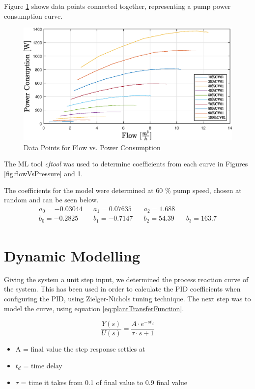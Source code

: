 \newpage
Figure \ref{fig:flowVsPowerConsumption} shows data points connected together, representing a pump
power consumption curve.

\begin{figure}[ht]
	\centering
	\includegraphics[width=1\textwidth]{figures/05mathematicalModelling/flowVsPowerRun34.eps}
	\caption{Data Points for Flow vs. Power Consumption}
	\label{fig:flowVsPowerConsumption}
\end{figure}

The ML tool \textit{cftool} \cite{cftool} was used to determine coefficients from each curve in  Figures 
\ref{fig:flowVsPressure} and \ref{fig:flowVsPowerConsumption}.

The coefficients for the model were determined at 60 \% pump speed, chosen at random and can be seen below.
\begin{align*}
	a_0 = -0.03044 && a_1 = 0.07635  && a_2 = 1.688  \\
	b_0 = -0.2825 && b_1 = -0.7147 && b_2 = 54.39 && b_3 = 163.7 \\
\end{align*}
\newpage
\section{Dynamic Modelling}
Giving the system a unit step input, we determined the process reaction curve of the system. This has been used 
in order to calculate the PID coefficients when configuring the PID, using Zielger-Nichols tuning technique.
The next step was to model the curve, using equation \ref{eq:plantTransferFunction}.

\begin{equation}
	\frac{Y(s)}{U(s)} = \frac{A \cdot e^{-st_d}}{\tau \cdot s + 1}
	\label{eq:plantTransferFunction}
\end{equation}
\cite{Franklin2014}
\begin{itemize}
	\item A = final value the step response settles at
	\item $t_{d}$ = time delay
	\item $\tau$ = time it takes from 0.1 of final value to 0.9 final value
\end{itemize}

